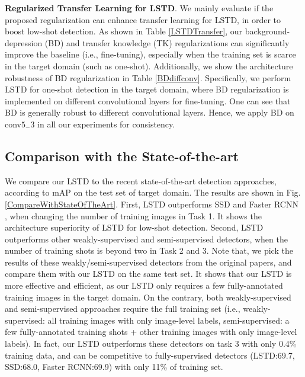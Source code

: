 \documentclass[letterpaper]{article} \usepackage{aaai18}  \usepackage{times}  \usepackage{helvet}  \usepackage{courier}  \usepackage{url}  \usepackage{graphicx}
\begin{document}
\textbf{Regularized Transfer Learning for LSTD}.
We mainly evaluate if the proposed regularization can enhance transfer learning for LSTD,
in order to boost low-shot detection.
As shown in Table \ref{LSTDTransfer},
our background-depression (BD) and transfer knowledge (TK) regularizations can significantly improve the baseline (i.e., fine-tuning),
especially when the training set is scarce in the target domain (such as one-shot).
Additionally,
we show the architecture robustness of BD regularization in Table \ref{BDdiffconv}.
Specifically,
we perform LSTD for one-shot detection in the target domain,
where
BD regularization is implemented on different convolutional layers for fine-tuning.
One can see that BD is generally robust to different convolutional layers.
Hence,
we apply BD on conv$5_{-}3$ in all our experiments for consistency.


\subsection{Comparison with the State-of-the-art}
We compare our LSTD to the recent state-of-the-art detection approaches,
according to mAP on the test set of target domain.
The results are shown in Fig. \ref{CompareWithStateOfTheArt}.
First,
LSTD outperforms SSD \cite{Liueccv2016} and Faster RCNN \cite{Renpami2016},
when changing the number of training images in Task 1.
It shows the architecture superiority of LSTD for low-shot detection.
Second,
LSTD outperforms other weakly-supervised \cite{wang2014weakly,teh2016attention,kantorov2016contextlocnet,bilen2016weaklyddn,li2016weakly,diba2016weakly,cinbis2017} and
semi-supervised \cite{dong2017few} detectors,
when the number of training shots is beyond two in Task 2 and 3.
Note that,
we pick the results of these weakly/semi-supervised detectors from the original papers,
and compare them with our LSTD on the same test set.
It shows that our LSTD is more effective and efficient,
as our LSTD only requires a few fully-annotated training images in the target domain. On the contrary,
both weakly-supervised and semi-supervised approaches require the full training set
(i.e.,
weakly-supervised: all training images with only image-level labels,
semi-supervised: a few fully-annotated training shots + other training images with only image-level labels).
In fact,
our LSTD outperforms these detectors on task 3 with only 0.4\% training data,
and can be competitive to fully-supervised detectors (LSTD:69.7, SSD:68.0, Faster RCNN:69.9) with only 11\% of training set.
\end{document}
